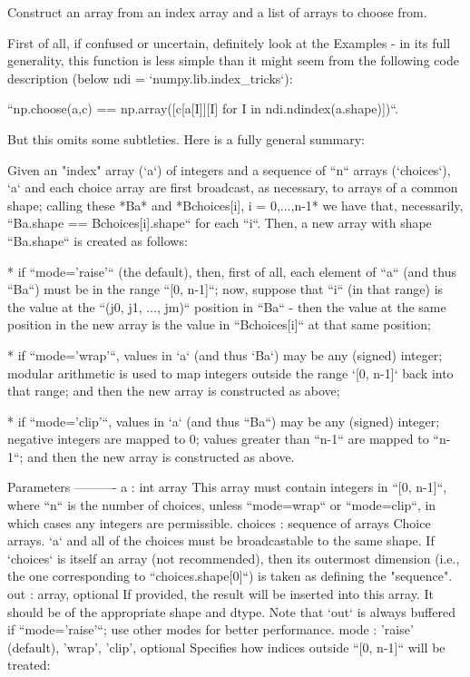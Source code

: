 \begin{DoxyVerb}Construct an array from an index array and a list of arrays to choose from.

First of all, if confused or uncertain, definitely look at the Examples -
in its full generality, this function is less simple than it might
seem from the following code description (below ndi =
`numpy.lib.index_tricks`):

``np.choose(a,c) == np.array([c[a[I]][I] for I in ndi.ndindex(a.shape)])``.

But this omits some subtleties.  Here is a fully general summary:

Given an "index" array (`a`) of integers and a sequence of ``n`` arrays
(`choices`), `a` and each choice array are first broadcast, as necessary,
to arrays of a common shape; calling these *Ba* and *Bchoices[i], i =
0,...,n-1* we have that, necessarily, ``Ba.shape == Bchoices[i].shape``
for each ``i``.  Then, a new array with shape ``Ba.shape`` is created as
follows:

* if ``mode='raise'`` (the default), then, first of all, each element of
  ``a`` (and thus ``Ba``) must be in the range ``[0, n-1]``; now, suppose
  that ``i`` (in that range) is the value at the ``(j0, j1, ..., jm)``
  position in ``Ba`` - then the value at the same position in the new array
  is the value in ``Bchoices[i]`` at that same position;

* if ``mode='wrap'``, values in `a` (and thus `Ba`) may be any (signed)
  integer; modular arithmetic is used to map integers outside the range
  `[0, n-1]` back into that range; and then the new array is constructed
  as above;

* if ``mode='clip'``, values in `a` (and thus ``Ba``) may be any (signed)
  integer; negative integers are mapped to 0; values greater than ``n-1``
  are mapped to ``n-1``; and then the new array is constructed as above.

Parameters
----------
a : int array
    This array must contain integers in ``[0, n-1]``, where ``n`` is the
    number of choices, unless ``mode=wrap`` or ``mode=clip``, in which
    cases any integers are permissible.
choices : sequence of arrays
    Choice arrays. `a` and all of the choices must be broadcastable to the
    same shape.  If `choices` is itself an array (not recommended), then
    its outermost dimension (i.e., the one corresponding to
    ``choices.shape[0]``) is taken as defining the "sequence".
out : array, optional
    If provided, the result will be inserted into this array. It should
    be of the appropriate shape and dtype. Note that `out` is always
    buffered if ``mode='raise'``; use other modes for better performance.
mode : {'raise' (default), 'wrap', 'clip'}, optional
    Specifies how indices outside ``[0, n-1]`` will be treated:


\end{DoxyVerb}
